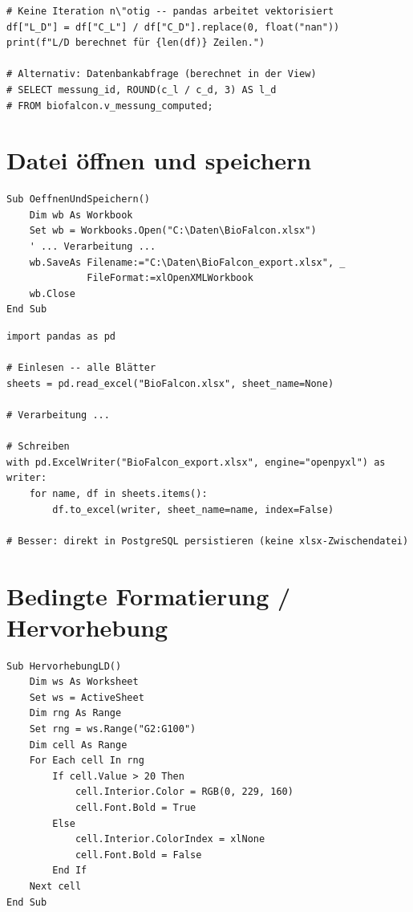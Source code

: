 ﻿\documentclass[12pt,a4paper]{report}
\theoremstyle{definition}
\theoremstyle{remark}
\begin{document}
\begin{lstlisting}[style=python, caption={Python-\"Aquivalent: Vektorisierte Berechnung}]
# Keine Iteration n\"otig -- pandas arbeitet vektorisiert
df["L_D"] = df["C_L"] / df["C_D"].replace(0, float("nan"))
print(f"L/D berechnet für {len(df)} Zeilen.")

# Alternativ: Datenbankabfrage (berechnet in der View)
# SELECT messung_id, ROUND(c_l / c_d, 3) AS l_d
# FROM biofalcon.v_messung_computed;
\end{lstlisting}

\section{Datei \"offnen und speichern}

\begin{lstlisting}[style=vba, caption={VBA: Workbook \"offnen und speichern}]
Sub OeffnenUndSpeichern()
    Dim wb As Workbook
    Set wb = Workbooks.Open("C:\Daten\BioFalcon.xlsx")
    ' ... Verarbeitung ...
    wb.SaveAs Filename:="C:\Daten\BioFalcon_export.xlsx", _
              FileFormat:=xlOpenXMLWorkbook
    wb.Close
End Sub
\end{lstlisting}

\begin{lstlisting}[style=python, caption={Python-\"Aquivalent: pandas read/write}]
import pandas as pd

# Einlesen -- alle Blätter
sheets = pd.read_excel("BioFalcon.xlsx", sheet_name=None)

# Verarbeitung ...

# Schreiben
with pd.ExcelWriter("BioFalcon_export.xlsx", engine="openpyxl") as writer:
    for name, df in sheets.items():
        df.to_excel(writer, sheet_name=name, index=False)

# Besser: direkt in PostgreSQL persistieren (keine xlsx-Zwischendatei)
\end{lstlisting}

\section{Bedingte Formatierung / Hervorhebung}

\begin{lstlisting}[style=vba, caption={VBA: Zellen bei L/D > 20 grün einfärben}]
Sub HervorhebungLD()
    Dim ws As Worksheet
    Set ws = ActiveSheet
    Dim rng As Range
    Set rng = ws.Range("G2:G100")
    Dim cell As Range
    For Each cell In rng
        If cell.Value > 20 Then
            cell.Interior.Color = RGB(0, 229, 160)
            cell.Font.Bold = True
        Else
            cell.Interior.ColorIndex = xlNone
            cell.Font.Bold = False
        End If
    Next cell
End Sub
\end{lstlisting}
\end{document}
